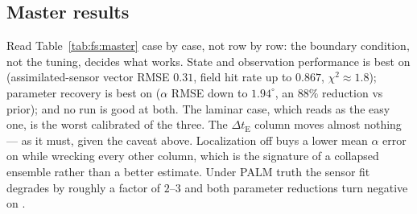 \begin{table}[H]
  \centering
  \caption{Filter smoothing: the \HybNumRuns{} experiments, their run IDs and
  the run directories under
   . IDs are
  assigned by sorting the directory names alphabetically; the directory name is
  given here and nowhere else in this section.  is
   (on) or  (off). Reference run of each
  case: H11, H12, H13.}
  \label{tab:fs:matrix}
  \HybMatrixTable
\end{table}

\subsection{Master results}
\label{sec:fs:master}

\begin{table}[H]
  \centering
  \caption{Filter smoothing: all \HybNumRuns{} runs, uDALES-truth block first.
  ``assim''/``valid'' are the vector RMSEs at the six assimilated and four
  validation sensors; ``field $\Umag$'' is the volume velocity-magnitude RMSE;
  $\alpha$ and $\Umag$ are parameter RMSEs with the reduction vs prior in
  parentheses; $\chi^2$ is the mean innovation chi-square over the $180$ cycles
  ($1$ = calibrated); $z_{\mathrm{par}}$ is the pooled parameter $z$-score
  standard deviation ($1$ = calibrated, $\gg 1$ = overconfident); $q$ is the
  field hit rate, undefined for PALM truth because truth and model live on
  different grids. Bold marks the best value per column within each truth
  block.}
  \label{tab:fs:master}
  \HybMasterTable
\end{table}

Read Table~\ref{tab:fs:master} case by case, not row by row: the boundary
condition, not the tuning, decides what works. State and observation
performance is best on  (assimilated-sensor vector RMSE
$0.31$, field hit rate up to $0.867$, $\chi^2 \approx 1.8$); parameter recovery
is best on  ($\alpha$ RMSE down to $1.94^\circ$, an $88\%$
reduction vs prior); and no run is good at both. The laminar  case,
which reads as the easy one, is the worst calibrated of the three. The
$\Delta t_{\mathrm{E}}$ column moves almost nothing --- as it must, given the
caveat above. Localization off buys a lower mean $\alpha$ error on
 while wrecking every other column, which is the signature of a
collapsed ensemble rather than a better estimate. Under PALM truth the sensor
fit degrades by roughly a factor of $2$--$3$ and both parameter reductions turn
negative on .


